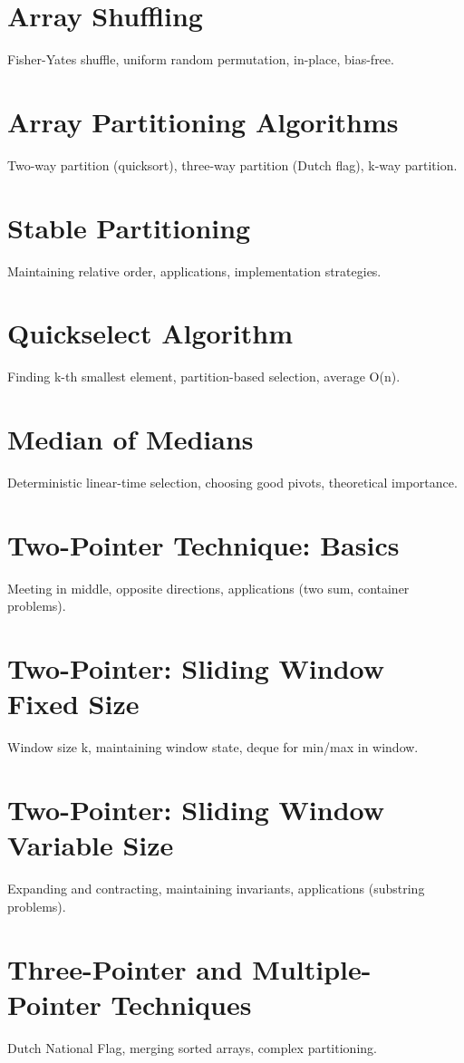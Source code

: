 \chapter{Array Shuffling}
Fisher-Yates shuffle, uniform random permutation, in-place, bias-free.

\chapter{Array Partitioning Algorithms}
Two-way partition (quicksort), three-way partition (Dutch flag), k-way partition.

\chapter{Stable Partitioning}
Maintaining relative order, applications, implementation strategies.

\chapter{Quickselect Algorithm}
Finding k-th smallest element, partition-based selection, average O(n).

\chapter{Median of Medians}
Deterministic linear-time selection, choosing good pivots, theoretical importance.

\chapter{Two-Pointer Technique: Basics}
Meeting in middle, opposite directions, applications (two sum, container problems).

\chapter{Two-Pointer: Sliding Window Fixed Size}
Window size k, maintaining window state, deque for min/max in window.

\chapter{Two-Pointer: Sliding Window Variable Size}
Expanding and contracting, maintaining invariants, applications (substring problems).

\chapter{Three-Pointer and Multiple-Pointer Techniques}
Dutch National Flag, merging sorted arrays, complex partitioning.

